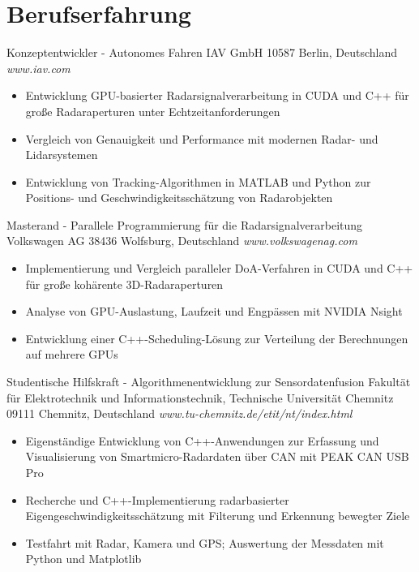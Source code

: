 \documentclass[11pt,a4paper,sans]{moderncv} %
\begin{document}
\section{Berufserfahrung}

{Konzeptentwickler - Autonomes Fahren}
{IAV GmbH}
{10587 Berlin, Deutschland}
{\textit{www.iav.com}}
{\begin{itemize}
    \item Entwicklung GPU-basierter Radarsignalverarbeitung in CUDA und C++ für große Radaraperturen unter Echtzeitanforderungen
    \item Vergleich von Genauigkeit und Performance mit modernen Radar- und Lidarsystemen
    \item Entwicklung von Tracking-Algorithmen in MATLAB und Python zur Positions- und Geschwindigkeitsschätzung von Radarobjekten
\end{itemize}}

{Masterand - Parallele Programmierung für die Radarsignalverarbeitung}
{Volkswagen AG}
{38436 Wolfsburg, Deutschland}
{\textit{www.volkswagenag.com}}
{
\begin{itemize}
    \item Implementierung und Vergleich paralleler DoA-Verfahren in CUDA und C++ für große kohärente 3D-Radaraperturen
    \item Analyse von GPU-Auslastung, Laufzeit und Engpässen mit NVIDIA Nsight
    \item Entwicklung einer C++-Scheduling-Lösung zur Verteilung der Berechnungen auf mehrere GPUs
\end{itemize}
} 

{Studentische Hilfskraft - Algorithmenentwicklung zur Sensordatenfusion}
{Fakultät für Elektrotechnik und Informationstechnik, Technische Universität Chemnitz}
{09111 Chemnitz, Deutschland}
{\textit{www.tu-chemnitz.de/etit/nt/index.html}}
{
\begin{itemize}
    \item Eigenständige Entwicklung von C++-Anwendungen zur Erfassung und Visualisierung von Smartmicro-Radardaten über CAN mit PEAK CAN USB Pro
    \item Recherche und C++-Implementierung radarbasierter Eigengeschwindigkeitsschätzung mit Filterung und Erkennung bewegter Ziele
    \item Testfahrt mit Radar, Kamera und GPS; Auswertung der Messdaten mit Python und Matplotlib
\end{itemize}
} 
\end{document}
